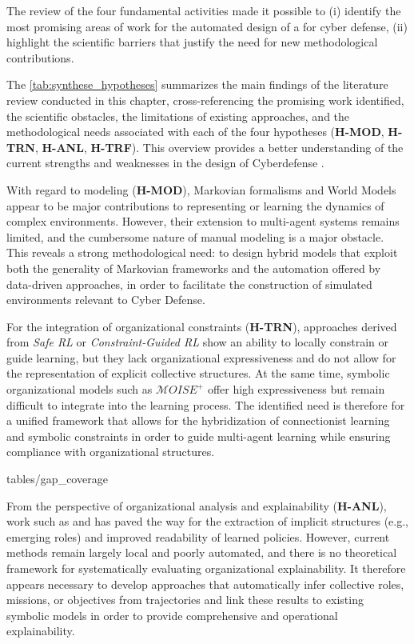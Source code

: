 The review of the four fundamental activities made it possible to
(i) identify the most promising areas of work for the automated design of a  for cyber defense,
(ii) highlight the scientific barriers that justify the need for new methodological contributions.

\noindent
The \autoref{tab:synthese_hypotheses} summarizes the main findings of the literature review conducted in this chapter, cross-referencing the promising work identified, the scientific obstacles, the limitations of existing approaches, and the methodological needs associated with each of the four hypotheses (\textbf{H-MOD}, \textbf{H-TRN}, \textbf{H-ANL}, \textbf{H-TRF}). This overview provides a better understanding of the current strengths and weaknesses in the design of Cyberdefense .

With regard to modeling (\textbf{H-MOD}), Markovian formalisms and World Models appear to be major contributions to representing or learning the dynamics of complex environments. However, their extension to multi-agent systems remains limited, and the cumbersome nature of manual modeling is a major obstacle. This reveals a strong methodological need: to design hybrid models that exploit both the generality of Markovian frameworks and the automation offered by data-driven approaches, in order to facilitate the construction of simulated environments relevant to Cyber Defense.

For the integration of organizational constraints (\textbf{H-TRN}), approaches derived from \textit{Safe RL} or \textit{Constraint-Guided RL} show an ability to locally constrain or guide learning, but they lack organizational expressiveness and do not allow for the representation of explicit collective structures. At the same time, symbolic organizational models such as $\mathcal{M}OISE^+$ offer high expressiveness but remain difficult to integrate into the learning process. The identified need is therefore for a unified framework that allows for the hybridization of connectionist learning and symbolic constraints in order to guide multi-agent learning while ensuring compliance with organizational structures.

 {tables/gap_coverage}

From the perspective of organizational analysis and explainability (\textbf{H-ANL}), work such as  and  has paved the way for the extraction of implicit structures (e.g., emerging roles) and improved readability of learned policies. However, current methods remain largely local and poorly automated, and there is no theoretical framework for systematically evaluating organizational explainability. It therefore appears necessary to develop approaches that automatically infer collective roles, missions, or objectives from trajectories and link these results to existing symbolic models in order to provide comprehensive and operational explainability.

